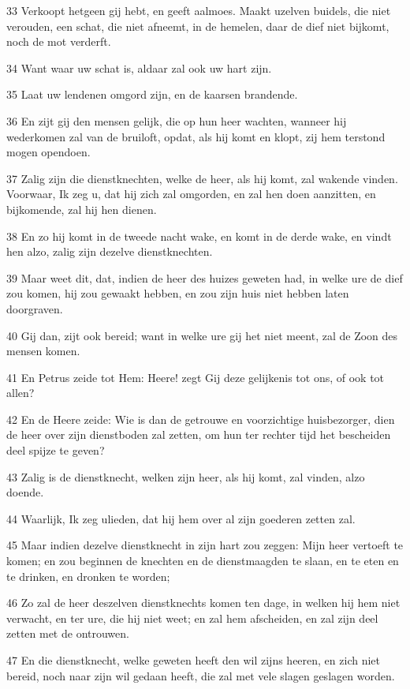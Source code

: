 \par 33 Verkoopt hetgeen gij hebt, en geeft aalmoes. Maakt uzelven buidels, die niet verouden, een schat, die niet afneemt, in de hemelen, daar de dief niet bijkomt, noch de mot verderft.
\par 34 Want waar uw schat is, aldaar zal ook uw hart zijn.
\par 35 Laat uw lendenen omgord zijn, en de kaarsen brandende.
\par 36 En zijt gij den mensen gelijk, die op hun heer wachten, wanneer hij wederkomen zal van de bruiloft, opdat, als hij komt en klopt, zij hem terstond mogen opendoen.
\par 37 Zalig zijn die dienstknechten, welke de heer, als hij komt, zal wakende vinden. Voorwaar, Ik zeg u, dat hij zich zal omgorden, en zal hen doen aanzitten, en bijkomende, zal hij hen dienen.
\par 38 En zo hij komt in de tweede nacht wake, en komt in de derde wake, en vindt hen alzo, zalig zijn dezelve dienstknechten.
\par 39 Maar weet dit, dat, indien de heer des huizes geweten had, in welke ure de dief zou komen, hij zou gewaakt hebben, en zou zijn huis niet hebben laten doorgraven.
\par 40 Gij dan, zijt ook bereid; want in welke ure gij het niet meent, zal de Zoon des mensen komen.
\par 41 En Petrus zeide tot Hem: Heere! zegt Gij deze gelijkenis tot ons, of ook tot allen?
\par 42 En de Heere zeide: Wie is dan de getrouwe en voorzichtige huisbezorger, dien de heer over zijn dienstboden zal zetten, om hun ter rechter tijd het bescheiden deel spijze te geven?
\par 43 Zalig is de dienstknecht, welken zijn heer, als hij komt, zal vinden, alzo doende.
\par 44 Waarlijk, Ik zeg ulieden, dat hij hem over al zijn goederen zetten zal.
\par 45 Maar indien dezelve dienstknecht in zijn hart zou zeggen: Mijn heer vertoeft te komen; en zou beginnen de knechten en de dienstmaagden te slaan, en te eten en te drinken, en dronken te worden;
\par 46 Zo zal de heer deszelven dienstknechts komen ten dage, in welken hij hem niet verwacht, en ter ure, die hij niet weet; en zal hem afscheiden, en zal zijn deel zetten met de ontrouwen.
\par 47 En die dienstknecht, welke geweten heeft den wil zijns heeren, en zich niet bereid, noch naar zijn wil gedaan heeft, die zal met vele slagen geslagen worden.
